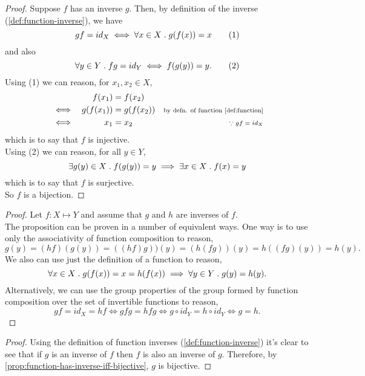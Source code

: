 \documentclass[../MathsNotesBase.tex]{subfiles}
\begin{document}
{\begin{proof}
			\nl[4]
			Suppose $f$ has an inverse $g$. Then, by definition of the inverse (\ref{def:function-inverse}), we have
			\[ gf = id_X \iff \forall x \in X \;.\; g(f(x)) = x  \tag{1} \]
			and also
			\[ \forall y \in Y \;.\; fg = id_Y \iff f(g(y)) = y. \tag{2} \]
			Using (1) we can reason, for ${ x_1, x_2 \in X }$,
			\[\begin{aligned}
				&& f(x_1) &= f(x_2) \\
				&\iff & g(f(x_1)) &= g(f(x_2)) &\text{\scriptsize{by defn. of function \ref{def:function}}} \\
				&\iff & x_1 &= x_2 &\text{\scriptsize{${ \because gf = id_X }$}} \\
			\end{aligned}\]
			which is to say that $f$ is injective.\\
			Using (2) we can reason, for all ${ y \in Y }$,
			\[ \exists g(y) \in X \;.\; f(g(y)) = y \implies \exists x \in X \;.\; f(x) = y \]
			which is to say that $f$ is surjective.\\
			So $f$ is a bijection.
		\end{proof}
	
		\medskip
		\begin{proof}
			Let ${ f: X \longmapsto Y }$ and assume that $g$ and $h$ are inverses of $f$.\\
			
			The proposition can be proven in a number of equivalent ways. One way is to use only the associativity of function composition to reason,
			\[ g(y) = (hf)(g(y)) = ((hf)g))(y) = (h(fg))(y) = h((fg)(y)) = h(y). \]
			We also can use just the definition of a function to reason,
			\[ \forall x \in X \;.\; g(f(x)) = x = h(f(x)) \implies \forall y \in Y \;.\; g(y) = h(y). \]
			Alternatively, we can use the group properties of the group formed by function composition over the set of invertible functions to reason,
			\[ gf = id_X = hf \iff gfg = hfg \iff g \circ id_Y = h \circ id_Y \iff g = h. \]
		\end{proof}
		
		\medskip
		\begin{proof}
			Using the definition of function inverses (\ref{def:function-inverse}) it's clear to see that if $g$ is an inverse of $f$ then $f$ is also an inverse of $g$. Therefore, by \autoref{prop:function-has-inverse-iff-bijective}, $g$ is bijective.
		\end{proof}
		
}
\end{document}
